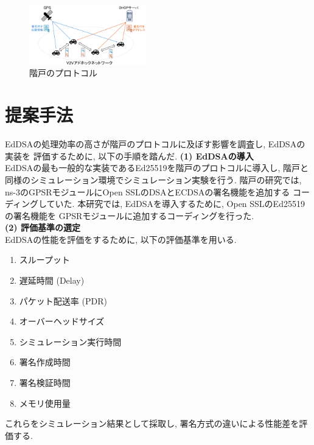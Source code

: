 \documentclass[a4j,9pt,twocolumn]{jsarticle}
\begin{document}
\vspace{-5mm} %
\begin{figure}[h]
    \centering
    \includegraphics[width=0.45\textwidth]{figures/introduce.png}
    \caption{階戸のプロトコル\cite{shinato}}
    \label{fig:introduce}
\end{figure}
\vspace{-5mm}
\section{提案手法}
\indent EdDSAの処理効率の高さが階戸のプロトコルに及ぼす影響を調査し, EdDSAの実装を
評価するために, 以下の手順を踏んだ. 
\noindent\textbf{(1) EdDSAの導入}\\
\indent EdDSAの最も一般的な実装であるEd25519を階戸のプロトコルに導入し, 
階戸と同様のシミュレーション環境でシミュレーション実験を行う. 
階戸の研究では, ns-3のGPSRモジュールにOpen SSLのDSAとECDSAの署名機能を追加する
コーディングしていた. 本研究では, EdDSAを導入するために, Open SSLのEd25519の署名機能を
GPSRモジュールに追加するコーディングを行った. \\
\noindent\textbf{(2) 評価基準の選定}\\
\indent EdDSAの性能を評価をするために, 以下の評価基準を用いる. 
\vspace{-3mm}
\begin{multicols}{2}
    \begin{enumerate}
        \item スループット
        \item 遅延時間 (Delay)
        \item パケット配送率 (PDR)
        \item オーバーヘッドサイズ\\
        \item シミュレーション実行時間
        \item 署名作成時間
        \item 署名検証時間
        \item メモリ使用量
    \end{enumerate}
\end{multicols}
\vspace{-3mm}
これらをシミュレーション結果として採取し, 署名方式の違いによる性能差を評価する. 
\end{document}
